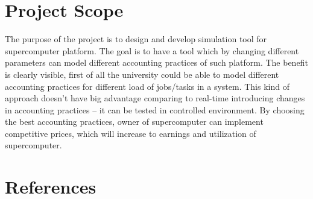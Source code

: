 \section{Project Scope}
	\begin{comment}
		$<$Provide a short description of the software being specified and its purpose, 
		including relevant benefits, objectives, and goals. Relate the software to 
		corporate goals or business strategies. If a separate vision and scope document 
		is available, refer to it rather than duplicating its contents here.$>$
	\end{comment}
	The purpose of the project is to design and develop simulation tool for supercomputer platform. The goal is to have a tool which by changing different parameters can model different accounting practices of such platform. The benefit is clearly visible, first of all the university could be able to model different accounting practices for different load of jobs/tasks in a system. This kind of approach doesn't have big advantage comparing to real-time introducing changes in accounting practices -- it can be tested in controlled environment. By choosing the best accounting practices, owner of supercomputer can implement competitive prices, which will increase to earnings and utilization of supercomputer.

\section{References}
	\begin{comment}
		$<$List any other documents or Web addresses to which this SRS refers. These may 
		include user interface style guides, contracts, standards, system requirements 
		specifications, use case documents, or a vision and scope document. Provide 
		enough information so that the reader could access a copy of each reference, 
		including title, author, version number, date, and source or location.$>$
	\end{comment}
